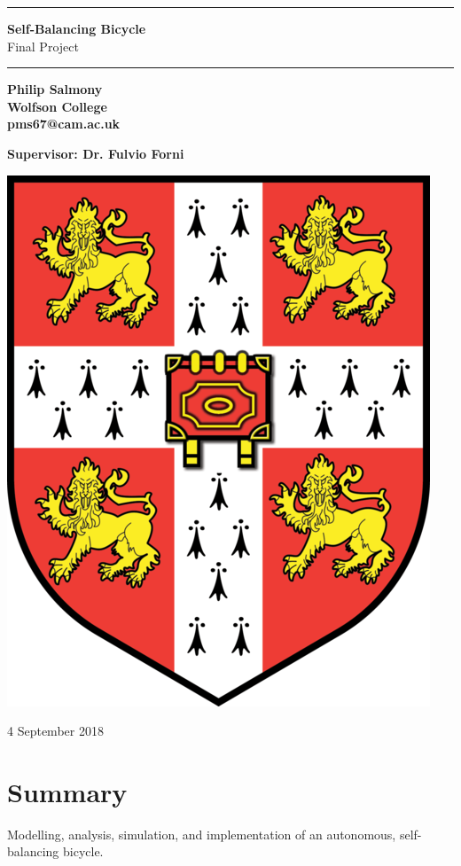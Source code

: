 \documentclass[a4paper]{article}
\begin{document}
\begin{titlepage}

	\begin{center}
	
		\hrule \vspace{0.3cm} \huge{\textbf{Self-Balancing Bicycle}} \vspace{0.2cm} \\ \Large{Final Project} \vspace{0.2cm} \hrule 
						
		\vspace{3cm}
		
		\large{\textbf{Philip Salmony \\ Wolfson College \\ pms67@cam.ac.uk}}
		
		\vspace{2cm}
		
		\large{\textbf{Supervisor: Dr. Fulvio Forni}}		
		
		\vspace{2cm}		
		
		\includegraphics[scale=0.15]{unilogo}
		
		\vspace{3cm}
		
		\large{4 September 2018}

	\end{center}

\vfill

\section*{Summary}
Modelling, analysis, simulation, and implementation of an autonomous, self-balancing bicycle.

\end{titlepage}
\end{document}
